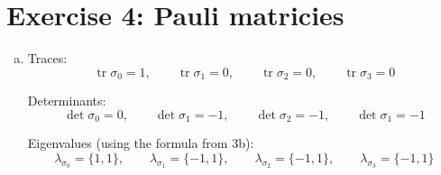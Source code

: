 \documentclass[a4paper,german,12pt,smallheadings]{scrartcl}
\begin{document}
\section*{Exercise 4: Pauli matricies}
\begin{enumerate}[a)]
  \item
    Traces:
    \begin{equation*}
      \operatorname{tr} \sigma_0 = 1, \qquad
      \operatorname{tr} \sigma_1 = 0, \qquad
      \operatorname{tr} \sigma_2 = 0, \qquad
      \operatorname{tr} \sigma_3 = 0
    \end{equation*}

    Determinants:
    \begin{equation*}
      \det \sigma_0 = 0, \qquad
      \det \sigma_1 = -1, \qquad
      \det \sigma_2 = -1, \qquad
      \det \sigma_1 = -1
    \end{equation*}

    Eigenvalues (using the formula from 3b):
    \begin{equation*}
      \lambda_{\sigma_0} = \{1,1\}, \qquad
      \lambda_{\sigma_1} = \{-1,1\}, \qquad
      \lambda_{\sigma_2} = \{-1,1\}, \qquad
      \lambda_{\sigma_3} = \{-1,1\}
    \end{equation*}


\end{enumerate}
\end{document}

